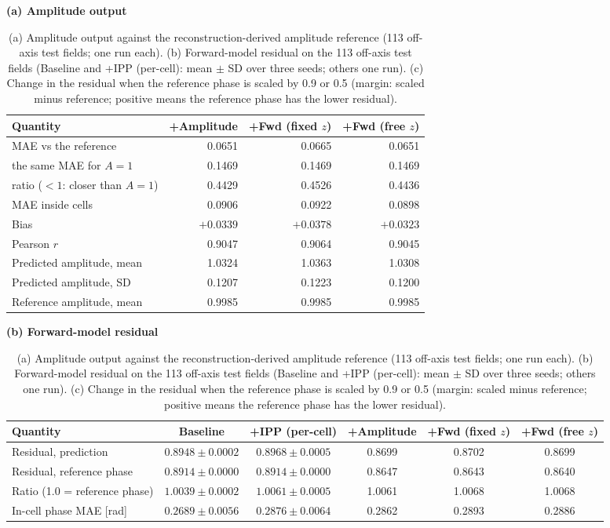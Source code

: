 \begin{table}[!htbp]
\centering
\caption{(a) Amplitude output against the reconstruction-derived amplitude
reference (113 off-axis test fields; one run each). (b) Forward-model residual
on the 113 off-axis test fields (Baseline and +IPP (per-cell): mean $\pm$ SD
over three seeds; others one run). (c) Change in the residual when the
reference phase is scaled by 0.9 or 0.5 (margin: scaled minus reference;
positive means the reference phase has the lower residual).}
\label{tab:amplitude}
\footnotesize
\textbf{(a) Amplitude output}\\[2pt]
\begin{tabular*}{\textwidth}{@{\extracolsep{\fill}}lrrr@{}}
\toprule
Quantity & +Amplitude & +Fwd (fixed $z$) & +Fwd (free $z$) \\
\midrule
MAE vs the reference & 0.0651 & 0.0665 & 0.0651 \\
\quad the same MAE for $A=1$ & 0.1469 & 0.1469 & 0.1469 \\
\quad ratio ($<1$: closer than $A=1$) & 0.4429 & 0.4526 & 0.4436 \\
MAE inside cells & 0.0906 & 0.0922 & 0.0898 \\
Bias & $+0.0339$ & $+0.0378$ & $+0.0323$ \\
Pearson $r$ & 0.9047 & 0.9064 & 0.9045 \\
Predicted amplitude, mean & 1.0324 & 1.0363 & 1.0308 \\
Predicted amplitude, SD & 0.1207 & 0.1223 & 0.1200 \\
Reference amplitude, mean & 0.9985 & 0.9985 & 0.9985 \\
\bottomrule
\end{tabular*}

\vspace{8pt}
\textbf{(b) Forward-model residual}\\[2pt]
\begin{tabular*}{\textwidth}{@{\extracolsep{\fill}}lccccc@{}}
\toprule
Quantity & Baseline & +IPP (per-cell) & +Amplitude & +Fwd (fixed $z$) & +Fwd (free $z$) \\
\midrule
Residual, prediction & $0.8948 \pm 0.0002$ & $0.8968 \pm 0.0005$ & 0.8699 & 0.8702 & 0.8699 \\
Residual, reference phase & $0.8914 \pm 0.0000$ & $0.8914 \pm 0.0000$ & 0.8647 & 0.8643 & 0.8640 \\
Ratio (1.0 = reference phase) & $1.0039 \pm 0.0002$ & $1.0061 \pm 0.0005$ & 1.0061 & 1.0068 & 1.0068 \\
In-cell phase MAE [rad] & $0.2689 \pm 0.0056$ & $0.2876 \pm 0.0064$ & 0.2862 & 0.2893 & 0.2886 \\
\bottomrule
\end{tabular*}


\end{table}
